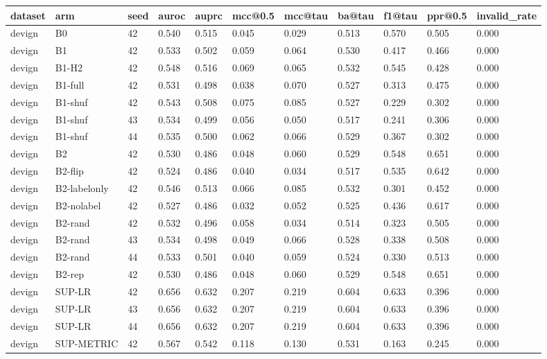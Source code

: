 \begin{tabular}{lllllllllll}
\toprule
dataset & arm & seed & auroc & auprc & mcc@0.5 & mcc@tau & ba@tau & f1@tau & ppr@0.5 & invalid\_rate \\
\midrule
devign & B0 & 42 & 0.540 & 0.515 & 0.045 & 0.029 & 0.513 & 0.570 & 0.505 & 0.000 \\
devign & B1 & 42 & 0.533 & 0.502 & 0.059 & 0.064 & 0.530 & 0.417 & 0.466 & 0.000 \\
devign & B1-H2 & 42 & 0.548 & 0.516 & 0.069 & 0.065 & 0.532 & 0.545 & 0.428 & 0.000 \\
devign & B1-full & 42 & 0.531 & 0.498 & 0.038 & 0.070 & 0.527 & 0.313 & 0.475 & 0.000 \\
devign & B1-shuf & 42 & 0.543 & 0.508 & 0.075 & 0.085 & 0.527 & 0.229 & 0.302 & 0.000 \\
devign & B1-shuf & 43 & 0.534 & 0.499 & 0.056 & 0.050 & 0.517 & 0.241 & 0.306 & 0.000 \\
devign & B1-shuf & 44 & 0.535 & 0.500 & 0.062 & 0.066 & 0.529 & 0.367 & 0.302 & 0.000 \\
devign & B2 & 42 & 0.530 & 0.486 & 0.048 & 0.060 & 0.529 & 0.548 & 0.651 & 0.000 \\
devign & B2-flip & 42 & 0.524 & 0.486 & 0.040 & 0.034 & 0.517 & 0.535 & 0.642 & 0.000 \\
devign & B2-labelonly & 42 & 0.546 & 0.513 & 0.066 & 0.085 & 0.532 & 0.301 & 0.452 & 0.000 \\
devign & B2-nolabel & 42 & 0.527 & 0.486 & 0.032 & 0.052 & 0.525 & 0.436 & 0.617 & 0.000 \\
devign & B2-rand & 42 & 0.532 & 0.496 & 0.058 & 0.034 & 0.514 & 0.323 & 0.505 & 0.000 \\
devign & B2-rand & 43 & 0.534 & 0.498 & 0.049 & 0.066 & 0.528 & 0.338 & 0.508 & 0.000 \\
devign & B2-rand & 44 & 0.533 & 0.501 & 0.040 & 0.059 & 0.524 & 0.330 & 0.513 & 0.000 \\
devign & B2-rep & 42 & 0.530 & 0.486 & 0.048 & 0.060 & 0.529 & 0.548 & 0.651 & 0.000 \\
devign & SUP-LR & 42 & 0.656 & 0.632 & 0.207 & 0.219 & 0.604 & 0.633 & 0.396 & 0.000 \\
devign & SUP-LR & 43 & 0.656 & 0.632 & 0.207 & 0.219 & 0.604 & 0.633 & 0.396 & 0.000 \\
devign & SUP-LR & 44 & 0.656 & 0.632 & 0.207 & 0.219 & 0.604 & 0.633 & 0.396 & 0.000 \\
devign & SUP-METRIC & 42 & 0.567 & 0.542 & 0.118 & 0.130 & 0.531 & 0.163 & 0.245 & 0.000 \\

\end{tabular}
